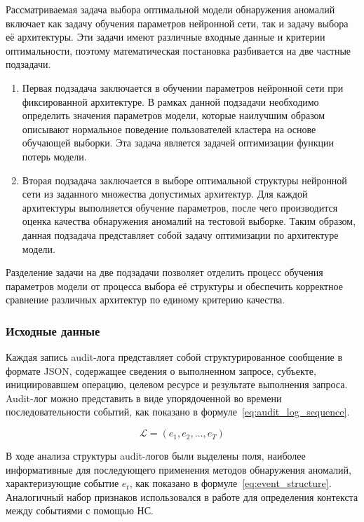 Рассматриваемая задача выбора оптимальной модели обнаружения аномалий включает как задачу обучения параметров нейронной сети, так и задачу выбора её архитектуры. Эти задачи имеют различные входные данные и критерии оптимальности, поэтому математическая постановка разбивается на две частные подзадачи.

\begin{enumerate}
    \item Первая подзадача заключается в обучении параметров нейронной сети при фиксированной архитектуре. В рамках данной подзадачи необходимо определить значения параметров модели, которые наилучшим образом описывают нормальное поведение пользователей кластера на основе обучающей выборки. Эта задача является задачей оптимизации функции потерь модели.
    \item Вторая подзадача заключается в выборе оптимальной структуры нейронной сети из заданного множества допустимых архитектур. Для каждой архитектуры выполняется обучение параметров, после чего производится оценка качества обнаружения аномалий на тестовой выборке. Таким образом, данная подзадача представляет собой задачу оптимизации по архитектуре модели.
\end{enumerate}

Разделение задачи на две подзадачи позволяет отделить процесс обучения параметров модели от процесса выбора её структуры и обеспечить корректное сравнение различных архитектур по единому критерию качества.

\subsubsection{Исходные данные}

Каждая запись audit-лога представляет собой структурированное сообщение в формате JSON, содержащее сведения о выполненном запросе, субъекте, инициировавшем операцию, целевом ресурсе и результате выполнения запроса. Audit-лог можно представить в виде упорядоченной во времени последовательности событий, как показано в формуле~\eqref{eq:audit_log_sequence}.

\begin{equation}\label{eq:audit_log_sequence}
    \mathcal{L} = ( e_1, e_2, \dots, e_T )
\end{equation}

В ходе анализа структуры audit-логов были выделены поля, наиболее информативные для последующего применения методов обнаружения аномалий, характеризующие событие $e_t$, как показано в формуле~\eqref{eq:event_structure}. Аналогичный набор признаков использовался в работе \cite{K8NTEXT} для определения контекста между событиями с помощью НС.

